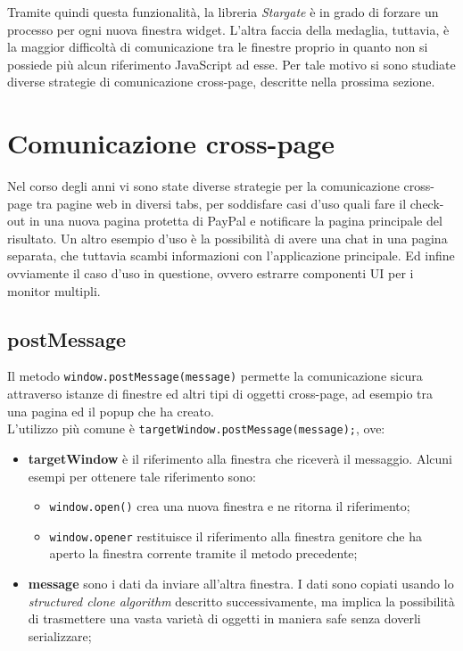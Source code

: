 Tramite quindi questa funzionalità, la libreria \textit{Stargate} è in grado di forzare un processo per ogni nuova finestra widget. L'altra faccia della medaglia, tuttavia, è la maggior difficoltà di comunicazione tra le finestre proprio in quanto non si possiede più alcun riferimento JavaScript ad esse. Per tale motivo si sono studiate diverse strategie di comunicazione cross-page, descritte nella prossima sezione.

\section{Comunicazione cross-page}

Nel corso degli anni vi sono state diverse strategie per la comunicazione cross-page tra pagine web in diversi tabs, per soddisfare casi d'uso quali fare il check-out in una nuova pagina protetta di PayPal e notificare la pagina principale del risultato. Un altro esempio d'uso è la possibilità di avere una chat in una pagina separata, che tuttavia scambi informazioni con l'applicazione principale. Ed infine ovviamente il caso d'uso in questione, ovvero estrarre componenti UI per i monitor multipli. \\

\subsection{postMessage}

Il metodo \texttt{window.postMessage(message)} permette la comunicazione sicura attraverso istanze di finestre ed altri tipi di oggetti cross-page, ad esempio tra una pagina ed il popup che ha creato. \\

L'utilizzo più comune è \texttt{targetWindow.postMessage(message);}, ove:

\begin{itemize}
    \item \textbf{targetWindow} è il riferimento alla finestra che riceverà il messaggio. Alcuni esempi per ottenere tale riferimento sono:
        \begin{itemize}
            \item \texttt{window.open()} crea una nuova finestra e ne ritorna il riferimento;
            \item \texttt{window.opener} restituisce il riferimento alla finestra genitore che ha aperto la finestra corrente tramite il metodo precedente;
        \end{itemize}
    \item \textbf{message} sono i dati da inviare all'altra finestra. I dati sono copiati usando lo \textit{structured clone algorithm} descritto successivamente, ma implica la possibilità di trasmettere una vasta varietà di oggetti in maniera safe senza doverli serializzare;
\end{itemize}

